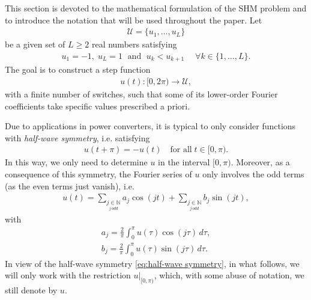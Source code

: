 \documentclass[twocolumn]{autart}    %
\begin{document}
This section is devoted to the mathematical formulation of the SHM problem and to introduce the notation that will be used throughout the paper. Let 
\begin{align}\label{eq:Udef}
	\mathcal{U} = \{u_1, \ldots, u_L\}
\end{align}
be a given set of $L\geq 2$ real numbers satisfying
\begin{align*}
	u_1 = -1, \; u_L = 1 \;\text{ and } \; u_k<u_{k+1} \quad\; \forall k\in \{1,\ldots, L\}.
\end{align*}
The goal is to construct a step function
\begin{align*}
	u(t):[0,2\pi)\to\mathcal U,
\end{align*}
with a finite number of switches, such that some of its lower-order Fourier coefficients take specific values prescribed a priori.

Due to applications in power converters,  it is typical to only consider functions with \textit{half-wave symmetry}, i.e. satisfying
\begin{align}\label{eq:half-wave symmetry}
	u(t + \pi) = -u(t)\quad \mbox{for all}\; t \in [0,\pi).
\end{align}
In this way, we only need to determine $u$ in the interval $[0,\pi)$. Moreover, as a consequence of this symmetry, the Fourier series of $u$ only involves the odd terms (as the even terms just vanish), i.e.
\begin{align*}
	u(t) = \sum_{\underset{j\, odd}{j \in \mathbb{N}}} a_j \cos(jt)+ \sum_{\underset{j\, odd}{j \in \mathbb{N}}}  b_j \sin(jt),
\end{align*}
with
\begin{equation} \label{eq:an}
	\begin{aligned}
		a_j = \frac{2}{\pi} \int_0^\pi u(\tau ) \cos(j \tau)\,d\tau, 
		\\[5pt]
		b_j = \frac{2}{\pi} \int_0^\pi u(\tau)  \sin(j \tau)\,d\tau.
	\end{aligned}
\end{equation}
In view of the half-wave symmetry \eqref{eq:half-wave symmetry}, in what follows, we will only work with the restriction $u|_{[0,\pi)}$, which, with some abuse of notation, we still denote by $u$. 
\end{document}
